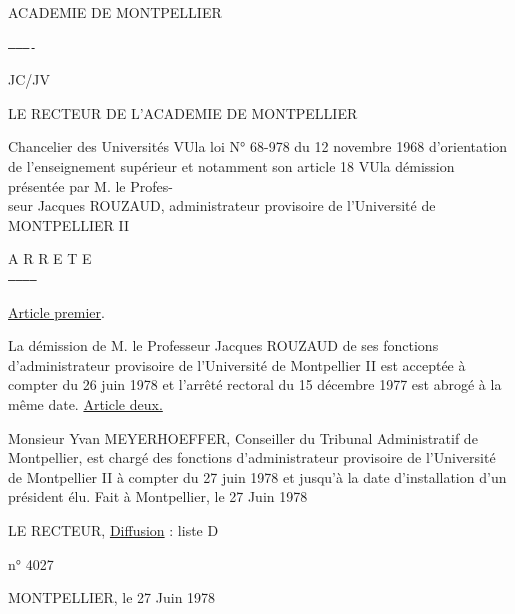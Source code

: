 ACADEMIE DE MONTPELLIER

\texttt{----------}

JC/JV

LE RECTEUR DE L'ACADEMIE DE MONTPELLIER

Chancelier des Universités
VU\qquad la loi N° 68-978 du 12 novembre 1968 d'orientation de l'enseignement supérieur et notamment son article 18
VU\qquad la démission présentée par M. le Profes-\\
seur Jacques ROUZAUD, administrateur provisoire de l'Université de MONTPELLIER II
\begin{center}
A R R E T E\\
\texttt{-----------}
\end{center}
\uline{Article premier}.

La démission de M. le Professeur Jacques ROUZAUD de ses fonctions d'administrateur provisoire de l'Université de Montpellier II est acceptée à compter du 26 juin 1978 et l'arrêté rectoral du 15 décembre 1977 est abrogé à la même date.
\uline{Article deux.}

Monsieur Yvan MEYERHOEFFER, Conseiller du Tribunal Administratif de Montpellier, est chargé des fonctions d'administrateur provisoire de l'Université de Montpellier II à compter du 27 juin 1978 et jusqu'à la date d'installation d'un président élu.
Fait à Montpellier, le 27 Juin 1978

LE RECTEUR,
\uline{Diffusion} : liste D

n° 4027

MONTPELLIER, le 27 Juin 1978

